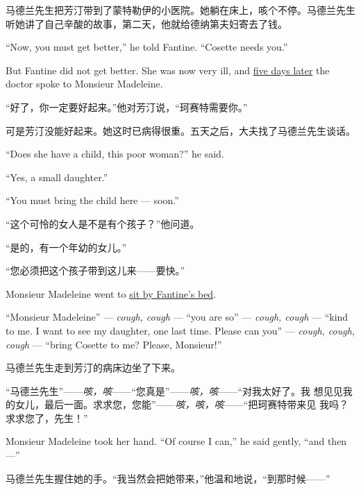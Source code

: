 \documentclass[fontset=ubuntu, zihao=5]{ctexart}
\begin{document}
\begin{paracol}{2}
  \switchcolumn

  马德兰先生把芳汀带到了蒙特勒伊的小医院。她躺在床上，咳个不停。马德兰先生听她讲了自己辛酸的故事，第二天，他就给德纳第夫妇寄去了钱。

  \switchcolumn*

  ``Now, you must get better,'' he told Fantine. ``Cosette needs you.''


  But Fantine did not get better. She was now very ill, and \uline{five days later} the doctor spoke to Monsieur Madeleine.

  \switchcolumn

  “好了，你一定要好起来。”他对芳汀说，“珂赛特需要你。”


  可是芳汀没能好起来。她这时已病得很重。五天之后，大夫找了马德兰先生谈话。

  \switchcolumn*

  ``Does she have a child, this poor woman?'' he said.


  ``Yes, a small daughter.''


  ``You must bring the child here --- soon.''

  \switchcolumn

  “这个可怜的女人是不是有个孩子？”他问道。


  “是的，有一个年幼的女儿。”


  “您必须把这个孩子带到这儿来——要快。”

  \switchcolumn*

  Monsieur Madeleine went to \uline{sit by Fantine's bed}.

  ``Monsieur Madeleine'' --- \emph{cough, cough} --- ``you are so'' --- \emph{cough, cough} --- ``kind to me. I want to see my daughter, one last time. Please can you'' --- \emph{cough, cough, cough} --- ``bring Cosette to me? Please, Monsieur!''

  \switchcolumn

  马德兰先生走到芳汀的病床边坐了下来。


  “马德兰先生”——\emph{咳，咳}——“您真是”——\emph{咳，咳}——“对我太好了。我
  想见见我的女儿，最后一面。求求您，您能”——\emph{咳，咳，咳}——“把珂赛特带来见
  我吗？求求您了，先生！”

  \switchcolumn*

  Monsieur Madeleine took her hand. ``Of course I can,'' he said gently, ``and
  then ---''

  \switchcolumn

  马德兰先生握住她的手。“我当然会把她带来，”他温和地说，“到那时候——”


\end{paracol}
\end{document}
